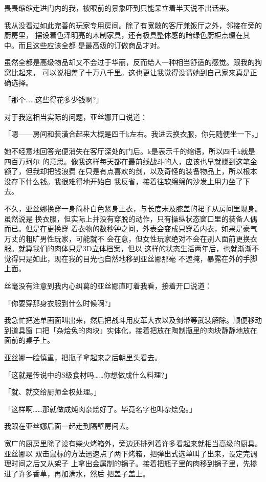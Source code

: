 \documentclass[11pt]{book}
\begin{document}
畏畏缩缩走进门内的我，被眼前的景象吓到只能呆立着半天说不出话来。

我从没看过如此完善的玩家专用房间。除了有宽敞的客厅兼饭厅之外，邻接在旁的厨房里，
摆设着色泽明亮的木制家具，还有极具整体感的暗绿色厨柜点缀在其中。而且这些应该全都
是最高级的订做商品才对。

虽然全都是高级物品却又不会过于华丽，反而给人一种相当舒适的感觉。跟我的狗窝比起来，
可以说相差了十万八千里。这也更让我觉得没请她到自己家来真是正确选择。

「那个……这些得花多少钱啊?」

对于我这相当实际的问题，亚丝娜开口说道：

「嗯——房间和装潢合起来大概是四千k左右。我进去换衣服，你先随便坐一下。」

她不经意地回答完便消失在客厅深处的门后。k是表示千的缩语，所以四千k就是四百万珂尔
的意思。像我这样每天都在最前线战斗的人，应该也早就赚到这笔金额了，但我却把钱浪费
在只是有点喜欢的剑，以及奇怪的装备物品上，所以根本没存下什么钱。我很难得地开始自
我反省，接着往软绵绵的沙发上用力坐了下去。

不久，亚丝娜换穿一身简朴白色紧身上衣，与长度未及膝盖的裙子从房间里现身。虽然说是
换衣服，但实际上并没有穿脱的动作，只有操纵状态窗口里的装备人偶而已。但是在更换穿
着衣物的数秒钟之间，外表会变成只穿着内衣，如果是豪气万丈的粗旷男性玩家，可能就不
会在意，但女性玩家绝对不会在别人面前更换衣服。就算我们的肉体只是3D立体档案，但以
这样的状态生活两年后，也就渐渐不觉得只是如此，现在我的目光也自然地移到亚丝娜那毫
不遮掩，暴露在外的手脚上面。

丝毫没有注意到我内心纠葛的亚丝娜直盯着我看，接着开口说道：

「你要穿那身衣服到什么时候啊?」

我急忙把选单画面叫出来，然后把战斗用皮革大衣以及剑带等武装解除。顺便移动到道具窗
口把「杂烩兔的肉块」实体化，接着把放在陶制瓶里的肉块静静地放在面前的桌子上。

亚丝娜一脸慎重，把瓶子拿起来之后朝里头看去。

「这就是传说中的S级食材吗……你想做成什么料理?」

「就、就交给厨师全权处理。」

「这样啊……那就做成炖肉杂烩好了。毕竟名字也叫杂烩兔。」

我跟在亚丝娜后面一起走到隔壁房间去。

宽广的厨房里除了设有柴火烤箱外，旁边还排列着许多看起来就相当高级的厨具。亚丝娜以
双击鼠标的方法迅速点了两下烤箱，把弹出式选单叫了出来，设定完调理时间之后又从架子
上拿出金属制的锅子。接着把瓶子里的肉移到锅子里，先掺进了许多香草，再加满水，然后
把盖子盖上。
\end{document}
